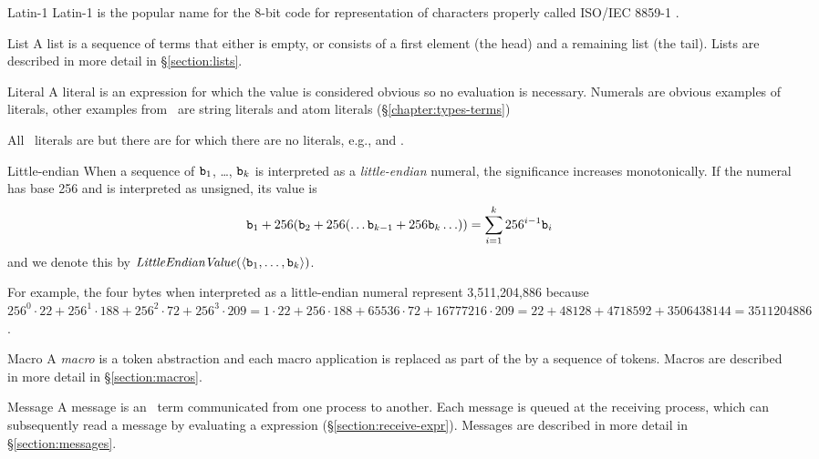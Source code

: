 \begin{Lentry}
\item[Latin-1]
Latin-1 is the popular name for the 8-bit code for representation of
characters properly called ISO/IEC 8859-1 \cite{latin-1}.

\item[List]
A list is a sequence of terms that either is empty, or consists of a
first element (the head) and a remaining list (the tail).  Lists are
described in more detail in
\S\ref{section:lists}.

\item[Literal]
A literal is an expression for which the value is considered obvious
so no evaluation is necessary.  Numerals are obvious examples of
literals, other examples from \Erlang\ are string literals and atom
literals (\S\ref{chapter:types-terms})

All \Erlang\ literals are  but there are  for which
there are no literals, e.g.,  and .

\item[Little-endian]
\label{page:little-endian}
When a sequence of  ${\tt{\sl b}}_1$, \ldots, ${\tt{\sl b}}_k$ is interpreted as a
\emph{little-endian} numeral, the significance increases monotonically.
If the numeral has base 256 and is interpreted as unsigned, its value
is
\[{\tt{\sl b}}_1+256({\tt{\sl b}}_2+256(\ldots{\tt{\sl b}}_{k-1}+256{\tt{\sl b}}_k\ldots)) = \sum_{i=1}^k 256^{i-1}{\tt{\sl b}}_i\]
and we denote this by
${\it LittleEndianValue}(\langle{\tt{\sl b}}_1, \ldots, {\tt{\sl b}}_k\rangle)$.

For example, the four bytes
 when interpreted as a little-endian numeral represent
3,511,204,886 because $256^0\cdot22+256^1\cdot188+256^2\cdot72+256^3\cdot209 =
1\cdot22+256\cdot188+65536\cdot72+16777216\cdot209 = 22+48128+4718592+3506438144 =
3511204886$.

\item[Macro]
A \emph{macro} is a token abstraction and each macro application is
replaced as part of the  by a sequence of
tokens. Macros are described in more detail in \S\ref{section:macros}.

\item[Message]
A message is an \Erlang\ term communicated from one process to
another.  Each message is queued at the receiving process, which can
subsequently read a message by evaluating a  expression
(\S\ref{section:receive-expr}).  Messages are described in more detail
in \S\ref{section:messages}.


\end{Lentry}
